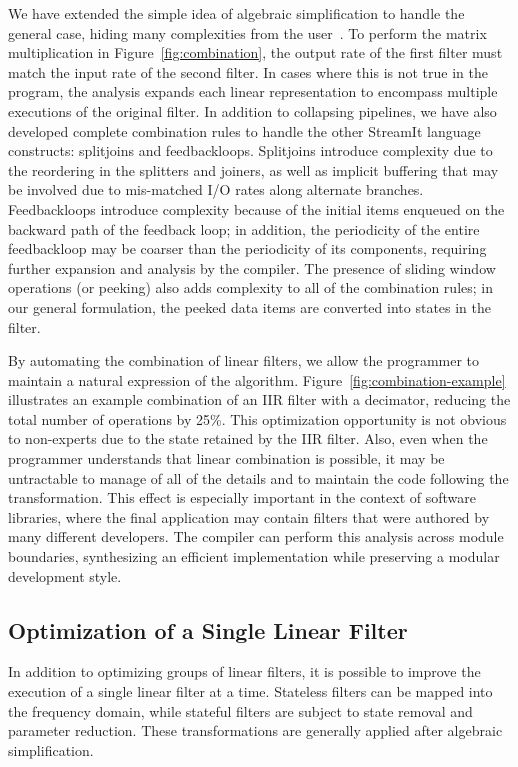 We have extended the simple idea of algebraic simplification to handle
the general case, hiding many complexities from the
user~\cite{agrawal:cases:2005}.  To perform the matrix multiplication
in Figure~\ref{fig:combination}, the output rate of the first filter
must match the input rate of the second filter.  In cases where this
is not true in the program, the analysis expands each linear
representation to encompass multiple executions of the original
filter.  In addition to collapsing pipelines, we have also developed
complete combination rules to handle the other StreamIt language
constructs: splitjoins and feedbackloops.  Splitjoins introduce
complexity due to the reordering in the splitters and joiners, as well
as implicit buffering that may be involved due to mis-matched I/O
rates along alternate branches.  Feedbackloops introduce complexity
because of the initial items enqueued on the backward path of the
feedback loop; in addition, the periodicity of the entire feedbackloop
may be coarser than the periodicity of its components, requiring
further expansion and analysis by the compiler.  The presence of
sliding window operations (or peeking) also adds complexity to all of
the combination rules; in our general formulation, the peeked data
items are converted into states in the filter.

By automating the combination of linear filters, we allow the
programmer to maintain a natural expression of the algorithm.
Figure~\ref{fig:combination-example} illustrates an example
combination of an IIR filter with a decimator, reducing the total
number of operations by 25\%.  This optimization opportunity is not
obvious to non-experts due to the state retained by the IIR filter.
Also, even when the programmer understands that linear combination is
possible, it may be untractable to manage of all of the details and to
maintain the code following the transformation.  This effect is
especially important in the context of software libraries, where the
final application may contain filters that were authored by many
different developers.  The compiler can perform this analysis across
module boundaries, synthesizing an efficient implementation while
preserving a modular development style.

\subsection*{Optimization of a Single Linear Filter}

In addition to optimizing groups of linear filters, it is possible to
improve the execution of a single linear filter at a time.  Stateless
filters can be mapped into the frequency domain, while stateful
filters are subject to state removal and parameter reduction.  These
transformations are generally applied after algebraic simplification.

